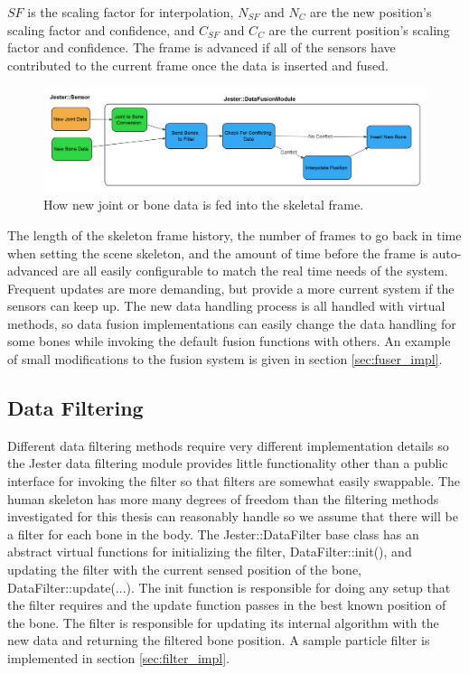 
$SF$ is the scaling factor for interpolation, $N_{SF}$ and $N_{C}$ are the new position's scaling factor and confidence, and $C_{SF}$ and $C_{C}$ are the current position’s scaling factor and confidence. The frame is advanced if all of the sensors have contributed to the current frame once the data is inserted and fused. 

\begin{figure}[]
\centering
\includegraphics[width=1\textwidth]{figures/insertionDataflow}
\caption{How new joint or bone data is fed into the skeletal frame.}
\label{fig:new_data_flow}
\end{figure}

The length of the skeleton frame history, the number of frames to go back in time when setting the scene skeleton, and the amount of time before the frame is auto-advanced are all easily configurable to match the real time needs of the system. Frequent updates are more demanding, but provide a more current system if the sensors can keep up. The new data handling process is all handled with virtual methods, so data fusion implementations can easily change the data handling for some bones while invoking the default fusion functions with others. An example of small modifications to the fusion system is given in section \ref{sec:fuser_impl}.
	
\subsection{Data Filtering}

Different data filtering methods require very different implementation details so the Jester data filtering module provides little functionality other than a public interface for invoking the filter so that filters are somewhat easily swappable. The human skeleton has more many degrees of freedom than the filtering methods investigated for this thesis can reasonably handle so we assume that there will be a filter for each bone in the body. The Jester::DataFilter base class has an abstract virtual functions for initializing the filter, DataFilter::init(), and updating the filter with the current sensed position of the bone, DataFilter::update(...). The init function is responsible for doing any setup that the filter requires and the update function passes in the best known position of the bone. The filter is responsible for updating its internal algorithm with the new data and returning the filtered bone position. A sample particle filter is implemented in section \ref{sec:filter_impl}.

